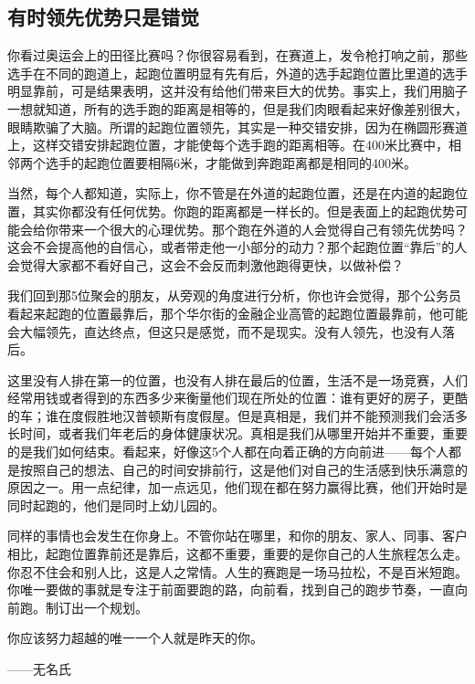 \subsection{有时领先优势只是错觉}

你看过奥运会上的田径比赛吗？你很容易看到，在赛道上，发令枪打响之前，那些选手在不同的跑道上，起跑位置明显有先有后，外道的选手起跑位置比里道的选手明显靠前，可是结果表明，这并没有给他们带来巨大的优势。事实上，我们用脑子一想就知道，所有的选手跑的距离是相等的，但是我们肉眼看起来好像差别很大，眼睛欺骗了大脑。所谓的起跑位置领先，其实是一种交错安排，因为在椭圆形赛道上，这样交错安排起跑位置，才能使每个选手跑的距离相等。在400米比赛中，相邻两个选手的起跑位置要相隔6米，才能做到奔跑距离都是相同的400米。

当然，每个人都知道，实际上，你不管是在外道的起跑位置，还是在内道的起跑位置，其实你都没有任何优势。你跑的距离都是一样长的。但是表面上的起跑优势可能会给你带来一个很大的心理优势。那个跑在外道的人会觉得自己有领先优势吗？这会不会提高他的自信心，或者带走他一小部分的动力？那个起跑位置“靠后”的人会觉得大家都不看好自己，这会不会反而刺激他跑得更快，以做补偿？

我们回到那5位聚会的朋友，从旁观的角度进行分析，你也许会觉得，那个公务员看起来起跑的位置最靠后，那个华尔街的金融企业高管的起跑位置最靠前，他可能会大幅领先，直达终点，但这只是感觉，而不是现实。没有人领先，也没有人落后。

这里没有人排在第一的位置，也没有人排在最后的位置，生活不是一场竞赛，人们经常用钱或者得到的东西多少来衡量他们现在所处的位置：谁有更好的房子，更酷的车；谁在度假胜地汉普顿斯有度假屋。但是真相是，我们并不能预测我们会活多长时间，或者我们年老后的身体健康状况。真相是我们从哪里开始并不重要，重要的是我们如何结束。看起来，好像这5个人都在向着正确的方向前进——每个人都是按照自己的想法、自己的时间安排前行，这是他们对自己的生活感到快乐满意的原因之一。用一点纪律，加一点远见，他们现在都在努力赢得比赛，他们开始时是同时起跑的，他们是同时上幼儿园的。

同样的事情也会发生在你身上。不管你站在哪里，和你的朋友、家人、同事、客户相比，起跑位置靠前还是靠后，这都不重要，重要的是你自己的人生旅程怎么走。你忍不住会和别人比，这是人之常情。人生的赛跑是一场马拉松，不是百米短跑。你唯一要做的事就是专注于前面要跑的路，向前看，找到自己的跑步节奏，一直向前跑。制订出一个规划。

\begin{BookQuote}
你应该努力超越的唯一一个人就是昨天的你。

\hfill ——无名氏
\end{BookQuote}

